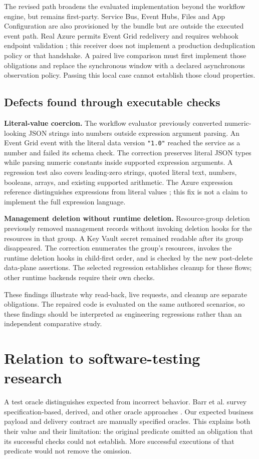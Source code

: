 \documentclass[10pt,a4paper]{article}
\begin{document}
The revised path broadens the evaluated implementation beyond the workflow engine, but remains first-party. Service Bus, Event Hubs, Files and App Configuration are also provisioned by the bundle but are outside the executed event path. Real Azure permits Event Grid redelivery and requires webhook endpoint validation \cite{eventdelivery,eventvalidation}; this receiver does not implement a production deduplication policy or that handshake. A paired live comparison must first implement those obligations and replace the synchronous window with a declared asynchronous observation policy. Passing this local case cannot establish those cloud properties.

\subsection{Defects found through executable checks}
\textbf{Literal-value coercion.} The workflow evaluator previously converted numeric-looking JSON strings into numbers outside expression argument parsing. An Event Grid event with the literal data version \texttt{"1.0"} reached the service as a number and failed its schema check. The correction preserves literal JSON types while parsing numeric constants inside supported expression arguments. A regression test also covers leading-zero strings, quoted literal text, numbers, booleans, arrays, and existing supported arithmetic. The Azure expression reference distinguishes expressions from literal values \cite{expressions}; this fix is not a claim to implement the full expression language.

\textbf{Management deletion without runtime deletion.} Resource-group deletion previously removed management records without invoking deletion hooks for the resources in that group. A Key Vault secret remained readable after its group disappeared. The correction enumerates the group's resources, invokes the runtime deletion hooks in child-first order, and is checked by the new post-delete data-plane assertions. The selected regression establishes cleanup for these flows; other runtime backends require their own checks.

These findings illustrate why read-back, live requests, and cleanup are separate obligations. The repaired code is evaluated on the same authored scenarios, so these findings should be interpreted as engineering regressions rather than an independent comparative study.

\section{Relation to software-testing research}
A test oracle distinguishes expected from incorrect behavior. Barr et al. survey specification-based, derived, and other oracle approaches \cite{oracles}. Our expected business payload and delivery contract are manually specified oracles. This explains both their value and their limitation: the original predicate omitted an obligation that its successful checks could not establish. More successful executions of that predicate would not remove the omission.
\end{document}
